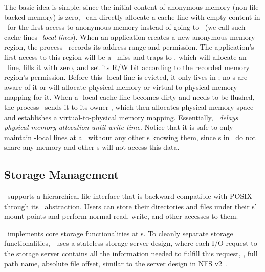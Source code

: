 \documentclass[10pt,times,twocolumn]{z2-article}
\begin{document}
{{{{{{{The basic idea is simple: since the initial content of anonymous memory 
(non-file-backed memory) is zero, %
\lego\ can directly allocate a cache line with empty content
in \excache\ for the first access to 
anonymous memory instead of going to \mcomponent\
(we call such cache lines {\em \pcomponent{}-local lines}).
When an application creates a new anonymous memory region, the process \microos\ records its address range and permission.
The application's first access to this region will be a \excache\ miss and traps to \lego,
which will allocate an \excache\ line, fills it with zero, 
and set its R/W bit according to the recorded memory region's permission.
Before this \pcomponent{}-local line is evicted, it only lives in \excache;
no \mcomponent{}s are aware of it or will allocate physical memory or virtual-to-physical memory mapping for it.
When a \pcomponent{}-local cache line becomes dirty and needs to be flushed, 
the process \microos\ sends it to its owner \mcomponent, which then
allocates physical memory space and establishes a virtual-to-physical memory mapping.
Essentially, \lego\ {\em delays physical memory allocation until write time}.
Notice that it is safe to only maintain \pcomponent{}-local lines at a \pcomponent{} \excache\ 
without any other \pcomponent{}s knowing them, 
since \pcomponent{}s in \lego\ do not share any memory
and other \pcomponent{}s will not access this data.

\subsection{Storage Management}
\lego\ supports a hierarchical file interface that is backward compatible with POSIX 
through its \vnode\ abstraction. 
Users can store their directories and files under their \vnode{}s' mount points
and perform normal read, write, and other accesses to them.

\lego\ implements core storage functionalities at \scomponent{}s.
To cleanly separate storage functionalities, \lego\ uses a stateless storage server design, 
where each I/O request to the storage server contains all the information needed to 
fulfill this request, \eg, full path name, absolute file offset,
similar to the server design in NFS v2~\cite{Sandberg-NFS-85}.

}}}}}}}
\end{document}
